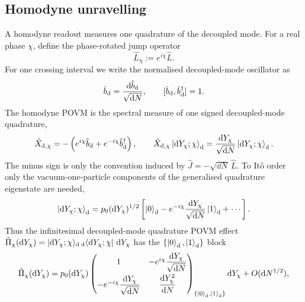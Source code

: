 \documentclass{article}
\numberwithin{equation}{section}
\begin{document}
	\subsection{Homodyne unravelling}
	\label{app:single_comp}

	A homodyne readout measures one quadrature of the decoupled mode. For a real phase \(\chi\), define the phase-rotated jump operator
	\begin{equation}
		\hat L_\chi := e^{i\chi}\hat L .
		\label{eq:LchiPOVMApp}
	\end{equation}
	For one crossing interval we write the normalised decoupled-mode oscillator as
	\begin{equation}
		\hat b_{\rm d} = \frac{\dd\hat b_{\rm d}}{\sqrt{\dd N}}, \qquad [\hat b_{\rm d},\hat b_{\rm d}^\dagger]=1 .
		\label{eq:NormalizedOutgoingShellOscillatorApp}
	\end{equation}
	The homodyne POVM is the spectral measure of one signed decoupled-mode quadrature,
	\begin{equation}
		\hat X_{{\rm d},\chi} = -\left( e^{i\chi}\hat b_{\rm d} + e^{-i\chi}\hat b_{\rm d}^\dagger \right), \qquad \hat X_{{\rm d},\chi}\ket{\dd Y_\chi;\chi}_{\rm d} = \frac{\dd Y_\chi}{\sqrt{\dd N}}\ket{\dd Y_\chi;\chi}_{\rm d}.
	\end{equation}
	The minus sign is only the convention induced by \(\hat J=-\sqrt{\dd N}\,\hat L\). To It\^o order only the vacuum-one-particle components of the generalised quadrature eigenstate are needed,
	\begin{equation}
		\ket{\dd Y_\chi;\chi}_{\rm d} = p_0(\dd Y_\chi)^{1/2} \left[ \ket{0}_{\rm d} - e^{-i\chi}\frac{\dd Y_\chi}{\sqrt{\dd N}}\ket{1}_{\rm d} +\cdots \right].
		\label{eq:HomodyneQuadratureEigenketApp}
	\end{equation}
	Thus the infinitesimal decoupled-mode quadrature POVM effect \(\hat\Pi_\chi(\dd Y_\chi)=\ket{\dd Y_\chi;\chi}\!{}_{\rm d}\,{}_{\rm d}\!\bra{\dd Y_\chi;\chi}\,\dd Y_\chi\) has the \(\{\ket{0}_{\rm d},\ket{1}_{\rm d}\}\) block
	\begin{equation}
		\hat\Pi_\chi(\dd Y_\chi) = p_0(\dd Y_\chi)
		\begin{pmatrix}
			1 & -e^{i\chi}\dfrac{\dd Y_\chi}{\sqrt{\dd N}} \\[8pt] -e^{-i\chi}\dfrac{\dd Y_\chi}{\sqrt{\dd N}} & \dfrac{\dd Y_\chi^2}{\dd N}
		\end{pmatrix}_{\{\ket{0}_{\rm d},\ket{1}_{\rm d}\}}
		\dd Y_\chi + O(\dd N^{1/2}),
		\label{eq:HomodynePOVMBlockApp}
	\end{equation}
\end{document}
